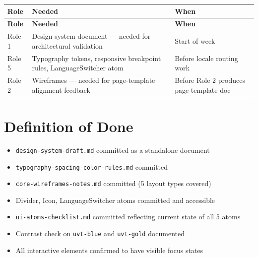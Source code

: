 \documentclass[12pt,a4paper]{article}
\begin{document}
\vspace{0.5em}
\begin{longtable}{@{}p{2cm}p{6.5cm}p{3.8cm}@{}}
\toprule
\rowcolor{uvtLightBlue}
\textbf{Role} & \textbf{Needed} & \textbf{When} \\
\midrule
\endfirsthead
\toprule
\rowcolor{uvtLightBlue}
\textbf{Role} & \textbf{Needed} & \textbf{When} \\
\midrule
\endhead
\bottomrule
\endfoot
Role 1 & Design system document --- needed for architectural validation & Start of week \\
Role 5 & Typography tokens, responsive breakpoint rules, LanguageSwitcher atom & Before locale routing work \\
Role 2 & Wireframes --- needed for page-template alignment feedback & Before Role 2 produces page-template doc \\
\end{longtable}

\section{Definition of Done}

\begin{itemize}
    \item[$\square$] \texttt{design-system-draft.md} committed as a standalone document
    \item[$\square$] \texttt{typography-spacing-color-rules.md} committed
    \item[$\square$] \texttt{core-wireframes-notes.md} committed (5 layout types covered)
    \item[$\square$] Divider, Icon, LanguageSwitcher atoms committed and accessible
    \item[$\square$] \texttt{ui-atoms-checklist.md} committed reflecting current state of all 5 atoms
    \item[$\square$] Contrast check on \texttt{uvt-blue} and \texttt{uvt-gold} documented
    \item[$\square$] All interactive elements confirmed to have visible focus states
\end{itemize}
\end{document}
